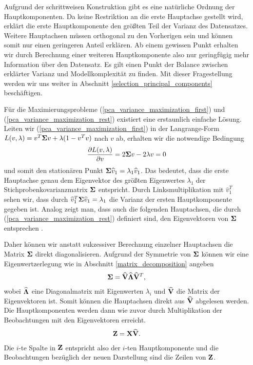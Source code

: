 Aufgrund der schrittweisen Konstruktion gibt es eine natürliche Ordnung der Hauptkomponenten. Da keine Restriktion an die erste Hauptachse gestellt wird, erklärt die erste Hauptkomponente den größten Teil der Varianz des Datensatzes. Weitere Hauptachsen müssen orthogonal zu den Vorherigen sein und können somit nur einen geringeren Anteil erklären. Ab einem gewissen Punkt erhalten wir durch Berechnung einer weiteren Hauptkomponente also nur geringfügig mehr Information über den Datensatz. Es gilt einen Punkt der Balance zwischen erklärter Varianz und Modellkomplexität zu finden. Mit dieser Fragestellung werden wir uns weiter in Abschnitt \ref{selection_principal_components} beschäftigen.

Für die Maximierungsprobleme (\ref{pca_variance_maximization_first}) und (\ref{pca_variance_maximization_rest}) existiert eine erstaunlich einfache Lösung. Leiten wir (\ref{pca_variance_maximization_first}) in der Langrange-Form $L(v, \lambda) = v^T\mathbf{\Sigma}v + \lambda (1-v^Tv)$ nach $v$ ab, erhalten wir die notwendige Bedingung 
$$\frac{\partial L(v,\lambda)}{\partial v} = 2\mathbf{\Sigma} v -2\lambda v=0$$
und somit den stationären Punkt $\mathbf{\Sigma}\widehat{v}_1 = \lambda_1 \widehat{v}_1$. Das bedeutet, dass die erste Hauptachse genau dem Eigenvektor des größten Eigenwertes $\lambda_1$ der Stichprobenkovarianzmatrix $\mathbf{\Sigma}$ entspricht. Durch Linksmultiplikation mit $\widehat{v}_1^T$ sehen wir, dass durch 
$\widehat{v}_1^T\mathbf{\Sigma}\widehat{v}_1 = \lambda_1$ die Varianz der ersten Hauptkomponente gegeben ist. Analog zeigt man, dass auch die folgenden Hauptachsen, die durch (\ref{pca_variance_maximization_rest}) definiert sind, den Eigenvektoren von $\mathbf{\Sigma}$ entsprechen \cite{bishop}.

Daher können wir anstatt sukzessiver Berechnung einzelner Hauptachsen die Matrix $\mathbf{\Sigma}$ direkt diagonalisieren. Aufgrund der Symmetrie von $\mathbf{\Sigma}$ können wir eine Eigenwertzerlegung wie in Abschnitt \ref{matrix_decomposition} angeben
$$\mathbf{\Sigma} = \widehat{\mathbf{V}} \widehat{\mathbf{\Lambda}} \widehat{\mathbf{V}}^T,$$
wobei $\widehat{\mathbf{\Lambda}}$ eine Diagonalmatrix mit Eigenwerten $\lambda_i$ und $\widehat{\mathbf{V}}$ die Matrix der Eigenvektoren ist. Somit können die Hauptachsen direkt aus $\widehat{\mathbf{V}}$ abgelesen werden. Die Hauptkomponenten werden dann wie zuvor durch Multiplikation der Beobachtungen mit den Eigenvektoren erreicht.
$$\mathbf{Z} = \mathbf{X} \widehat{\mathbf{V}}.$$
Die $i$-te Spalte in $\mathbf{Z}$ entspricht also der $i$-ten Hauptkomponente und die Beobachtungen bezüglich der neuen Darstellung sind die Zeilen von $\mathbf{Z}$.

